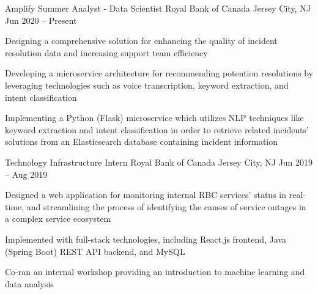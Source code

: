 

\begin{cventries}

  \cventry
	{Amplify Summer Analyst - Data Scientist}
	{Royal Bank of Canada}
	{Jersey City, NJ}
	{Jun 2020 – Present}
	{
    \begin{cvitems}
		  \item {Designing a comprehensive solution for enhancing the quality of incident resolution data and increasing support team efficiency}
		  \item {Developing a microservice architecture for recommending potention resolutions by leveraging technologies such as voice transcription, keyword extraction, and intent classification}
		  \item {Implementing a Python (Flask) microservice which utilizes NLP techniques like keyword extraction and intent classification in order to retrieve related incidents' solutions from an Elasticsearch database containing incident information}
    \end{cvitems}
  }
  
  
  \cventry
  {Technology Infrastructure Intern}
  {Royal Bank of Canada}
  {Jersey City, NJ}
  {Jun 2019 -- Aug 2019}
  {
    \begin{cvitems}
      \item {Designed a web application for monitoring internal RBC services' status in real-time, and streamlining the process of identifying the causes of service outages in a complex service ecosystem}
      \item {Implemented with full-stack technologies, including React.js frontend, Java (Spring Boot) REST API backend, and MySQL}
      \item {Co-ran an internal workshop providing an introduction to machine learning and data analysis}
    \end{cvitems}
  }



\end{cventries}
